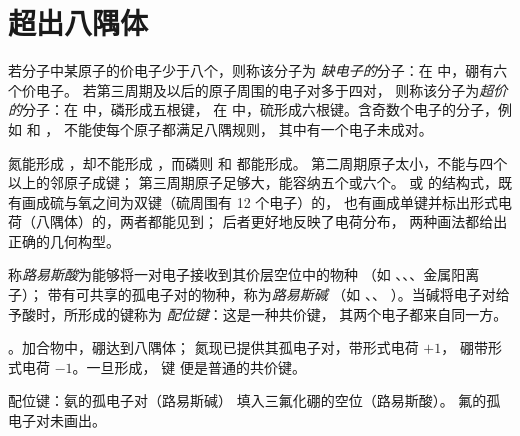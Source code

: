 \section{超出八隅体}

\begin{definition}[缺电子分子与超价分子]\label{def:b1:lewis-resonance-vsepr:hypervalent}
若分子中某原子的价电子少于八个，则称该分子为
\emph{缺电子的}分子：在  中，硼有六个价电子。
若第三周期及以后的原子周围的电子对多于四对，
则称该分子为\emph{超价的}分子：在  中，磷形成五根键，
在  中，硫形成六根键。含奇数个电子的分子，例如  和 ，
不能使每个原子都满足八隅规则，
其中有一个电子未成对。
\end{definition}

\begin{remark}[为何是第三周期而非第二周期]\label{rem:b1:lewis-resonance-vsepr:hypervalent}
氮能形成 ，却不能形成 ，而磷则  和  都能形成。
第二周期原子太小，不能与四个以上的邻原子成键；
第三周期原子足够大，能容纳五个或六个。
 或  的结构式，既有画成硫与氧之间为双键（硫周围有 12 个电子）的，
也有画成单键并标出形式电荷（八隅体）的，两者都能见到；
后者更好地反映了电荷分布，
两种画法都给出正确的几何构型。
\end{remark}

\begin{definition}\label{def:b1:lewis-resonance-vsepr:lewis-acid}
称\emph{路易斯酸}为能够将一对电子接收到其价层空位中的物种
（如 、、、金属阳离子）；
带有可共享的孤电子对的物种，称为\emph{路易斯碱}
（如 、、
）。当碱将电子对给予酸时，所形成的键称为
\emph{配位键}：这是一种共价键，
其两个电子都来自同一方。
\end{definition}

\begin{example}[氨与三氟化硼]\label{ex:b1:lewis-resonance-vsepr:adduct}
。加合物中，硼达到八隅体；
氮现已提供其孤电子对，带形式电荷 $+1$，
硼带形式电荷 $-1$。一旦形成， 键
便是普通的共价键。
\end{example}

\begin{omfigure}

{\small 配位键：氨的孤电子对（路易斯碱）
填入三氟化硼的空位（路易斯酸）。
氟的孤电子对未画出。}
\end{omfigure}

